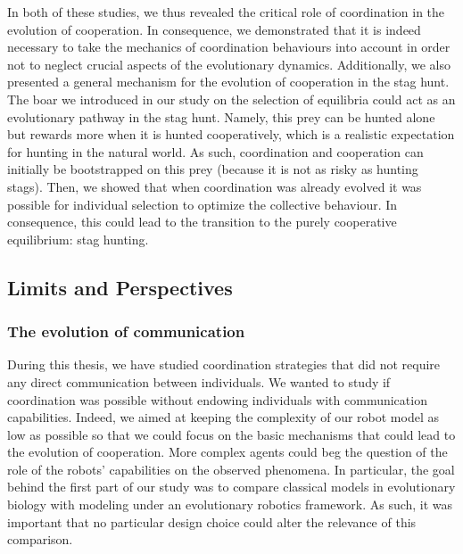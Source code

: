 		In both of these studies, we thus revealed the critical role of coordination in the evolution of cooperation. In consequence, we demonstrated that it is indeed necessary to take the mechanics of coordination behaviours into account in order not to neglect crucial aspects of the evolutionary dynamics. Additionally, we also presented a general mechanism for the evolution of cooperation in the stag hunt. The boar we introduced in our study on the selection of equilibria could act as an evolutionary pathway in the stag hunt. Namely, this prey can be hunted alone but rewards more when it is hunted cooperatively, which is a realistic expectation for hunting in the natural world. As such, coordination and cooperation can initially be bootstrapped on this prey (because it is not as risky as hunting stags). Then, we showed that when coordination was already evolved it was possible for individual selection to optimize the collective behaviour. In consequence, this could lead to the transition to the purely cooperative equilibrium: stag hunting.


	\subsection{Limits and Perspectives}

		\subsubsection{The evolution of communication}

			During this thesis, we have studied coordination strategies that did not require any direct communication between individuals. We wanted to study if coordination was possible without endowing individuals with communication capabilities. Indeed, we aimed at keeping the complexity of our robot model as low as possible so that we could focus on the basic mechanisms that could lead to the evolution of cooperation. More complex agents could beg the question of the role of the robots' capabilities on the observed phenomena. In particular, the goal behind the first part of our study was to compare classical models in evolutionary biology with modeling under an evolutionary robotics framework. As such, it was important that no particular design choice could alter the relevance of this comparison.

